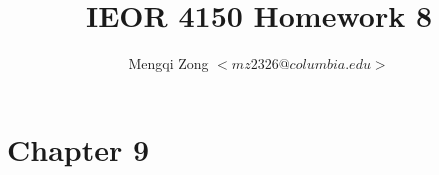 \documentclass[12pt]{article}
\title{IEOR 4150 Homework 8}
\author{Mengqi Zong $<mz2326@columbia.edu>$}
\begin{document}
\maketitle

\setlength{\parindent}{0in}

\section*{Chapter 9}
\end{document}
